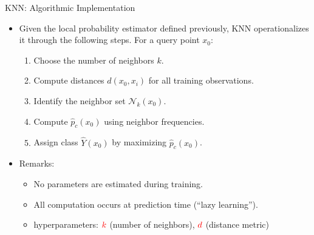 \documentclass[aspectratio=169]{beamer}
\newcommand{\1}{\mathbf{1}}
\begin{document}
\begin{frame}{KNN: Algorithmic Implementation}
    \small
    \begin{itemize}
    \item Given the local probability estimator defined previously,
    KNN operationalizes it through the following steps. For a query point $x_0$:
    \begin{enumerate}
        \item Choose the number of neighbors $k$.
        \item Compute distances $d(x_0, x_i)$ for all training observations.
        \item Identify the neighbor set $\mathcal{N}_k(x_0)$.
        \item Compute $\hat{p}_c(x_0)$ using neighbor frequencies.
        \item Assign class $\hat{Y}(x_0)$ by maximizing $\hat{p}_c(x_0)$.
    \end{enumerate}
    \item Remarks:
    \begin{itemize}
        \item No parameters are estimated during training.
        \item All computation occurs at prediction time (``lazy learning'').
        \item hyperparameters: $\color{red}{k}$ (number of neighbors), $\color{red}{d}$ (distance metric)
    \end{itemize}
    \end{itemize}
\end{frame}
\end{document}
